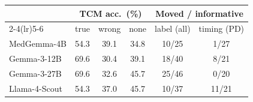 \begin{tabular}{lccccc}
\toprule
 & \multicolumn{3}{c}{TCM acc.\ (\%)} & \multicolumn{2}{c}{Moved / informative} \\
\cmidrule(lr){2-4}\cmidrule(lr){5-6}
 & true & wrong & none & label (all) & timing (PD) \\
\midrule
MedGemma-4B & 54.3 & 39.1 & 34.8 & 10/25 & 1/27 \\
Gemma-3-12B & 69.6 & 30.4 & 39.1 & 18/40 & 8/21 \\
Gemma-3-27B & 69.6 & 32.6 & 45.7 & 25/46 & 0/20 \\
Llama-4-Scout & 54.3 & 37.0 & 45.7 & 10/37 & 11/21 \\
\bottomrule
\end{tabular}
